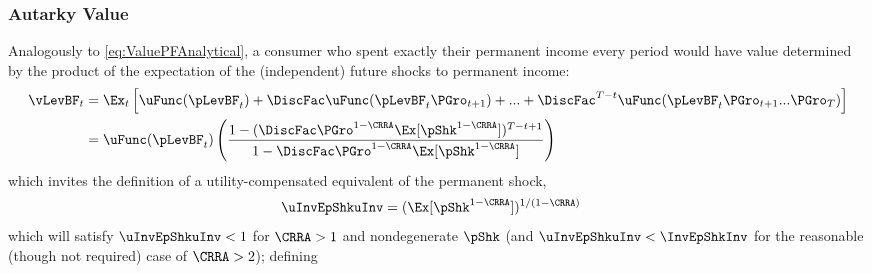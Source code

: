 \documentclass[BufferStockTheory]{subfiles}
\begin{document}
\subsubsection{Autarky Value}
Analogously to \eqref{eq:ValuePFAnalytical}, a consumer who spent exactly their permanent income every period would have value determined by the product of the expectation of the (independent) future shocks to permanent income:\hypertarget{uInvEpShkuInv}{}
\begin{align*}
  \vLevBF_{t}  & = \Ex_{t}\left[\uFunc(\pLevBF_{t}) + \DiscFac \uFunc(\pLevBF_{t}\PGro_{t+1}) + ... + \DiscFac^{T-t}\uFunc(\pLevBF_{t}\PGro_{t+1}...\PGro_{T})\right] \\
               & = \uFunc(\pLevBF_{t})\left(\frac{1-(\DiscFac \PGro^{1-\CRRA}\Ex[\pShk^{1-\CRRA}])^{T-t+1}}{1-\DiscFac \PGro^{1-\CRRA} \Ex[\pShk^{1-\CRRA}]}\right)
\end{align*}
which invites the definition of a utility-compensated equivalent of the permanent shock,\hypertarget{PGrouAdj}{}
\begin{align*}
  \uInvEpShkuInv  & = (\Ex[\pShk^{1-\CRRA}])^{1/(1-\CRRA)}
\end{align*}
which will satisfy $\uInvEpShkuInv < 1$ for $\CRRA>1$ and nondegenerate $\pShk$ (and $\uInvEpShkuInv < \InvEpShkInv$ for the reasonable (though not required) case of $\CRRA > 2$);\hypertarget{DiscAltuAdj}{}
defining
\end{document}
